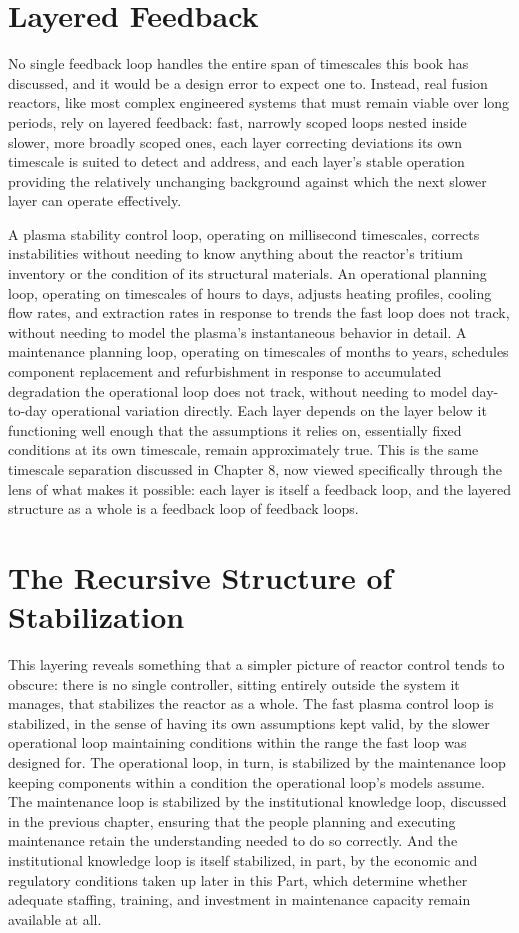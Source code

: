 \section{Layered Feedback}

No single feedback loop handles the entire span of timescales this book has discussed, and it would be a design error to expect one to. Instead, real fusion reactors, like most complex engineered systems that must remain viable over long periods, rely on layered feedback: fast, narrowly scoped loops nested inside slower, more broadly scoped ones, each layer correcting deviations its own timescale is suited to detect and address, and each layer's stable operation providing the relatively unchanging background against which the next slower layer can operate effectively.

A plasma stability control loop, operating on millisecond timescales, corrects instabilities without needing to know anything about the reactor's tritium inventory or the condition of its structural materials. An operational planning loop, operating on timescales of hours to days, adjusts heating profiles, cooling flow rates, and extraction rates in response to trends the fast loop does not track, without needing to model the plasma's instantaneous behavior in detail. A maintenance planning loop, operating on timescales of months to years, schedules component replacement and refurbishment in response to accumulated degradation the operational loop does not track, without needing to model day-to-day operational variation directly. Each layer depends on the layer below it functioning well enough that the assumptions it relies on, essentially fixed conditions at its own timescale, remain approximately true. This is the same timescale separation discussed in Chapter 8, now viewed specifically through the lens of what makes it possible: each layer is itself a feedback loop, and the layered structure as a whole is a feedback loop of feedback loops.

\section{The Recursive Structure of Stabilization}

This layering reveals something that a simpler picture of reactor control tends to obscure: there is no single controller, sitting entirely outside the system it manages, that stabilizes the reactor as a whole. The fast plasma control loop is stabilized, in the sense of having its own assumptions kept valid, by the slower operational loop maintaining conditions within the range the fast loop was designed for. The operational loop, in turn, is stabilized by the maintenance loop keeping components within a condition the operational loop's models assume. The maintenance loop is stabilized by the institutional knowledge loop, discussed in the previous chapter, ensuring that the people planning and executing maintenance retain the understanding needed to do so correctly. And the institutional knowledge loop is itself stabilized, in part, by the economic and regulatory conditions taken up later in this Part, which determine whether adequate staffing, training, and investment in maintenance capacity remain available at all.

